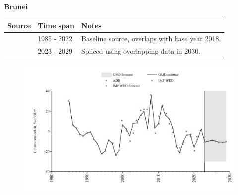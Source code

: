 \documentclass[12pt,a4paper,landscape]{article}
\begin{document}
\begin{adjustbox}{max totalsize={\paperwidth}{\paperheight},center}
\begin{minipage}[t][\textheight][t]{\textwidth}
\vspace*{0.5cm}
{}
\begin{center}
{\Large\bfseries Brunei}
\end{center}
\vspace{0.5cm}
\begin{table}[H]
\centering
\small
\begin{tabular}{|l|l|l|}
\hline
\textbf{Source} & \textbf{Time span} & \textbf{Notes} \\
\hline
\rowcolor{white}\cite{IMF_WEO}& 1985 - 2022 &Baseline source, overlaps with base year 2018.\\
\rowcolor{lightgray}\cite{IMF_WEO_forecast}& 2023 - 2029 &Spliced using overlapping data in 2030.\\
\hline
\end{tabular}
\end{table}
\begin{figure}[H]
\centering
\includegraphics[width=\textwidth,height=0.6\textheight,keepaspectratio]{graphs/BRN_govdef_GDP.pdf}
\end{figure}
\end{minipage}
\end{adjustbox}
\end{document}
